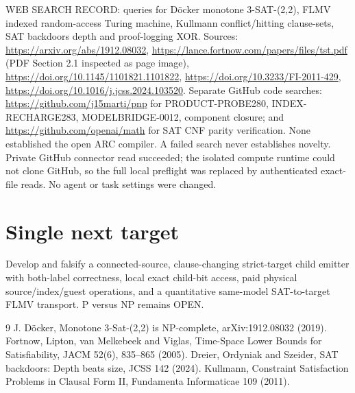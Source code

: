 \documentclass[11pt]{article}
\begin{document}
WEB SEARCH RECORD: queries for D\"ocker monotone 3-SAT-(2,2), FLMV indexed random-access Turing machine, Kullmann conflict/hitting clause-sets, SAT backdoors depth and proof-logging XOR. Sources: \url{https://arxiv.org/abs/1912.08032}, \url{https://lance.fortnow.com/papers/files/tst.pdf} (PDF Section 2.1 inspected as page image), \url{https://doi.org/10.1145/1101821.1101822}, \url{https://doi.org/10.3233/FI-2011-429}, \url{https://doi.org/10.1016/j.jcss.2024.103520}. Separate GitHub code searches: \url{https://github.com/j15marti/pnp} for PRODUCT-PROBE280, INDEX-RECHARGE283, MODELBRIDGE-0012, component closure; and \url{https://github.com/openai/math} for SAT CNF parity verification. None established the open ARC compiler. A failed search never establishes novelty. Private GitHub connector read succeeded; the isolated compute runtime could not clone GitHub, so the full local preflight was replaced by authenticated exact-file reads. No agent or task settings were changed.

\section{Single next target}
Develop and falsify a connected-source, clause-changing strict-target child emitter with both-label correctness, local exact child-bit access, paid physical source/index/guest operations, and a quantitative same-model SAT-to-target FLMV transport. P versus NP remains OPEN.
\begin{thebibliography}{9}
 J. D\"ocker, Monotone 3-Sat-(2,2) is NP-complete, arXiv:1912.08032 (2019).
 Fortnow, Lipton, van Melkebeek and Viglas, Time-Space Lower Bounds for Satisfiability, JACM 52(6), 835--865 (2005).
 Dreier, Ordyniak and Szeider, SAT backdoors: Depth beats size, JCSS 142 (2024).
 Kullmann, Constraint Satisfaction Problems in Clausal Form II, Fundamenta Informaticae 109 (2011).
\end{thebibliography}
\end{document}
